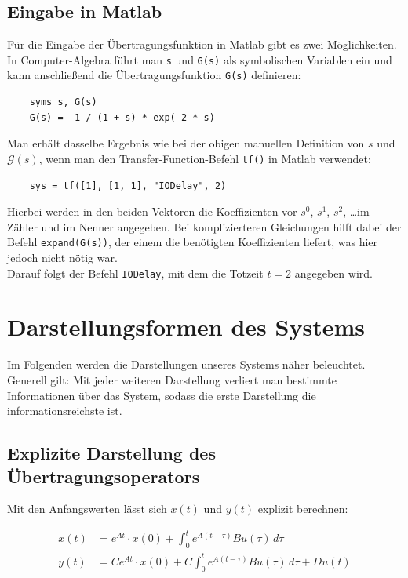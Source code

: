 \subsection{Eingabe in Matlab}
Für die Eingabe der Übertragungsfunktion in Matlab gibt es zwei Möglichkeiten. \\
In Computer-Algebra führt man \texttt{s} und \texttt{G(s)} als symbolischen Variablen ein und kann anschließend die Übertragungsfunktion \texttt{G(s)} definieren:

\begin{verbatim}
    syms s, G(s)
    G(s) =  1 / (1 + s) * exp(-2 * s)
\end{verbatim}

Man erhält dasselbe Ergebnis wie bei der obigen manuellen Definition von $s$ und $\mathcal{G}(s)$, wenn man den Transfer-Function-Befehl \texttt{tf()} in Matlab verwendet:

\begin{verbatim}
    sys = tf([1], [1, 1], "IODelay", 2)
\end{verbatim}

Hierbei werden in den beiden Vektoren die Koeffizienten vor $s^0$, $s^1$, $s^2$, \ldots im Zähler und im Nenner angegeben. Bei komplizierteren Gleichungen hilft dabei der Befehl \texttt{expand(G(s))}, der einem die benötigten Koeffizienten liefert, was hier jedoch nicht nötig war. \\
Darauf folgt der Befehl \texttt{\textquotedbl IODelay\textquotedbl}, mit dem die Totzeit $t = 2$ angegeben wird.

\section{Darstellungsformen des Systems}
Im Folgenden werden die Darstellungen unseres Systems näher beleuchtet. Generell gilt: Mit jeder weiteren Darstellung verliert man bestimmte Informationen über das System, sodass die erste Darstellung die informationsreichste ist.

\subsection{Explizite Darstellung des Übertragungsoperators}

Mit den Anfangswerten lässt sich $x(t)$ und $y(t)$ explizit berechnen:

\begin{align*}
    x(t) & = e^{At} \cdot x(0) + \int_{0}^{t} e^{A(t-\tau)}Bu(\tau) \,d\tau \nonumber \\
    y(t) & = Ce^{At} \cdot x(0) + C \int_{0}^{t} e^{A(t-\tau)}Bu(\tau) \,d\tau + Du(t)
\end{align*}

